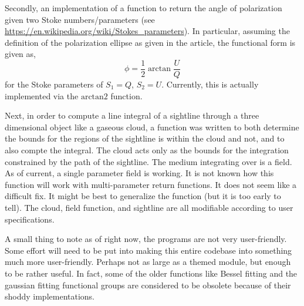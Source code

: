 \documentclass[twocolumn]{article}
\begin{document}
Secondly, an implementation of a function to return the angle of polarization given two Stoke numbers/parameters (see \url{https://en.wikipedia.org/wiki/Stokes_parameters}). In particular, assuming the definition of the polarization ellipse as given in the article, the functional form is given as,
\begin{equation}
	\phi = \frac{1}{2} \arctan{\frac{U}{Q}}
\end{equation}
for the Stoke parameters of $S_1 = Q$, $S_2 = U$. Currently, this is actually implemented via the $\text{arctan2}$ function.

Next, in order to compute a line integral of a sightline through a three dimensional object like a gaseous cloud, a function was written to both determine the bounds for the regions of the sightline is within the cloud and not, and to also compte the integral. The cloud acts only as the bounds for the integration constrained by the path of the sightline. The medium integrating over is a field. As of current, a single parameter field is working. It is not known how this function will work with multi-parameter return functions. It does not seem like a difficult fix. It might be best to generalize the function (but it is too early to tell). The cloud, field function, and sightline are all modifiable according to user specifications. 

A small thing to note as of right now, the programs are not very user-friendly. Some effort will need to be put into making this entire codebase into something much more user-friendly. Perhaps not as large as a themed module, but enough to be rather useful. In fact, some of the older functions like Bessel fitting and the gaussian fitting functional groups are considered to be obsolete because of their shoddy implementations.




\printbibliography
\end{document}
